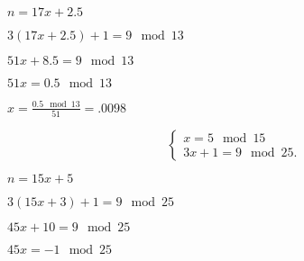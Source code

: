 \documentclass[10pt]{book}
\begin{document}
\begin{mdSnippets}
\begin{mdInlineSnippet}[02fe841315e9e253433d5f3846bc614b]%
$n = 17x + 2.5$\end{mdInlineSnippet}%
\begin{mdInlineSnippet}[2b33c61271e0d71fa4f74a87634783bd]%
$3(17x + 2.5) + 1 = 9 \mod 13$\end{mdInlineSnippet}%
\begin{mdInlineSnippet}[a506ba54934af15f18c55c384c07c790]%
$51x + 8.5 = 9 \mod 13$\end{mdInlineSnippet}%
\begin{mdInlineSnippet}[f7ce0882057924eb45f6f714e8d4c0e2]%
$51x = 0.5 \mod 13$\end{mdInlineSnippet}%
\begin{mdInlineSnippet}%
$x = \frac{0.5 \mod 13} {51} = .0098$\end{mdInlineSnippet}%
\begin{mdDisplaySnippet}[b24687b8eb20387e6ce8b088003a7f25]%
\[%
\left\{\begin{array}{l}
x = 5 \mod 15\\
3x + 1 = 9 \mod 25.
\end{array}\right.
\]%
\end{mdDisplaySnippet}%
\begin{mdInlineSnippet}%
$n = 15x + 5$\end{mdInlineSnippet}%
\begin{mdInlineSnippet}[0aa0d4ae68928fb798270e4d22cf8309]%
$3(15x + 3) + 1 = 9 \mod 25$\end{mdInlineSnippet}%
\begin{mdInlineSnippet}%
$45x + 10 = 9 \mod 25$\end{mdInlineSnippet}%
\begin{mdInlineSnippet}%
$45x = -1 \mod 25$\end{mdInlineSnippet}%
\begin{mdInlineSnippet}[bfbce2d5e3508ad027585491846ee775]%
$x = \frac{-1 \mod 25} {45} = \frac{8|/15$\end{mdInlineSnippet}%
\begin{mdInlineSnippet}%

\end{mdInlineSnippet}
\end{mdSnippets}
\end{document}
